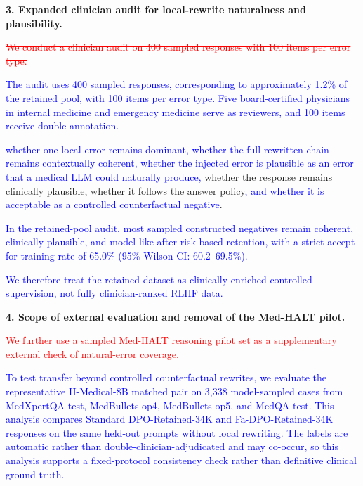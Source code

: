 \documentclass[12pt]{article}
\newcommand{\deleted}[1]{\textcolor{red}{\sout{#1}}}
\newcommand{\added}[1]{\textcolor{blue}{#1}}
\begin{document}
\textbf{3. Expanded clinician audit for local-rewrite naturalness and plausibility.}
\begin{displayquote}
\deleted{We conduct a clinician audit on 400 sampled responses with 100 items per error type.}

\added{The audit uses 400 sampled responses, corresponding to approximately 1.2\% of the retained pool, with 100 items per error type. Five board-certified physicians in internal medicine and emergency medicine serve as reviewers, and 100 items receive double annotation.}

\added{whether one local error remains dominant, whether the full rewritten chain remains contextually coherent, whether the injected error is plausible as an error that a medical LLM could naturally produce,} whether the response remains clinically plausible, whether it follows the answer policy\added{, and whether it is acceptable as a controlled counterfactual negative}.

\added{In the retained-pool audit, most sampled constructed negatives remain coherent, clinically plausible, and model-like after risk-based retention, with a strict accept-for-training rate of 65.0\% (95\% Wilson CI: 60.2--69.5\%).}

\added{We therefore treat the retained dataset as clinically enriched controlled supervision, not fully clinician-ranked RLHF data.}
\end{displayquote}

\textbf{4. Scope of external evaluation and removal of the Med-HALT pilot.}
\begin{displayquote}
\deleted{We further use a sampled Med-HALT reasoning pilot set as a supplementary external check of natural-error coverage.}

\added{To test transfer beyond controlled counterfactual rewrites, we evaluate the representative II-Medical-8B matched pair on 3,338 model-sampled cases from MedXpertQA-test, MedBullets-op4, MedBullets-op5, and MedQA-test. This analysis compares Standard DPO-Retained-34K and Fa-DPO-Retained-34K responses on the same held-out prompts without local rewriting. The labels are automatic rather than double-clinician-adjudicated and may co-occur, so this analysis supports a fixed-protocol consistency check rather than definitive clinical ground truth.}
\end{displayquote}
\end{document}
